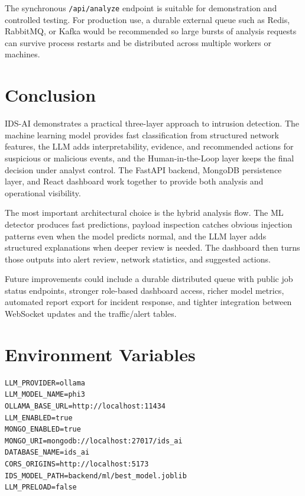 \documentclass[12pt,a4paper]{report}
\begin{document}
The synchronous \texttt{/api/analyze} endpoint is suitable for demonstration
and controlled testing. For production use, a durable external queue such as
Redis, RabbitMQ, or Kafka would be recommended so large bursts of analysis
requests can survive process restarts and be distributed across multiple
workers or machines.

\chapter{Conclusion}

IDS-AI demonstrates a practical three-layer approach to intrusion detection.
The machine learning model provides fast classification from structured
network features, the LLM adds interpretability, evidence, and recommended
actions for suspicious or malicious events, and the Human-in-the-Loop layer
keeps the final decision under analyst control. The FastAPI backend, MongoDB
persistence layer, and React dashboard work together to provide both analysis
and operational visibility.

The most important architectural choice is the hybrid analysis flow. The ML
detector produces fast predictions, payload inspection catches obvious
injection patterns even when the model predicts normal, and the LLM layer adds
structured explanations when deeper review is needed. The dashboard then
turns those outputs into alert review, network statistics, and suggested
actions.

Future improvements could include a durable distributed queue with public job
status endpoints, stronger role-based dashboard access, richer model metrics,
automated report export for incident response, and tighter integration between
WebSocket updates and the traffic/alert tables.

\appendix

\chapter{Environment Variables}

\begin{lstlisting}[style=bashstyle, caption={Recommended backend environment variables}]
LLM_PROVIDER=ollama
LLM_MODEL_NAME=phi3
OLLAMA_BASE_URL=http://localhost:11434
LLM_ENABLED=true
MONGO_ENABLED=true
MONGO_URI=mongodb://localhost:27017/ids_ai
DATABASE_NAME=ids_ai
CORS_ORIGINS=http://localhost:5173
IDS_MODEL_PATH=backend/ml/best_model.joblib
LLM_PRELOAD=false
\end{lstlisting}
\end{document}
